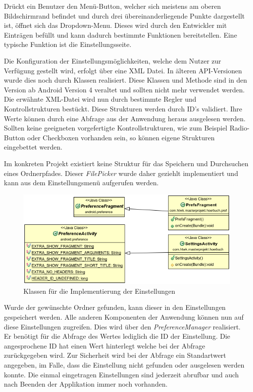 Drückt ein Benutzer den Menü-Button, welcher sich meistens am oberen Bildschirmrand befindet und durch drei übereinanderliegende Punkte dargestellt ist, öffnet sich das Dropdown-Menu. Dieses wird durch den Entwickler mit Einträgen befüllt und kann dadurch bestimmte Funktionen bereitstellen. Eine typische Funktion ist die Einstellungsseite.

Die Konfiguration der Einstellungsmöglichkeiten, welche dem Nutzer zur Verfügung gestellt wird, erfolgt über eine XML Datei. In älteren API-Versionen wurde dies noch durch Klassen realisiert. Diese Klassen und Methode sind in den Version ab Android Version 4 veraltet und sollten nicht mehr verwendet werden. Die erwähnte XML-Datei wird nun durch bestimmte Regler und Kontrollstrukturen bestückt. Diese Strukturen werden durch ID's validiert. Ihre Werte können durch eine Abfrage aus der Anwendung heraus ausgelesen werden. Sollten keine geeigneten vorgefertigte Kontrollstrukturen, wie zum Beispiel Radio-Button oder Checkboxen vorhanden sein, so können eigene Strukturen eingebettet werden.

Im konkreten Projekt existiert keine Struktur für das Speichern und Durchsuchen eines Ordnerpfades. Dieser \textit{FilePicker} wurde daher geziehlt implementiert und kann aus dem Einstellungsmenü aufgerufen werden.

\begin{center}
\begin{figure}
\includegraphics[scale=0.7]{images/settings}
\caption{Klassen für die Implementierung der Einstellungen}
\label{settings}
\end{figure}
\end{center}

Wurde der gewünschte Ordner gefunden, kann dieser in den Einstellungen gespeichert werden. Alle anderen Komponenten der Anwendung können nun auf diese Einstellungen zugreifen. Dies wird über den \textit{PreferenceManager} realisiert. Er benötigt für die Abfrage des Wertes lediglich die ID der Einstellung. Die angesprochene ID hat einen Wert hinterlegt welche bei der Abfrage zurückgegeben wird. Zur Sicherheit wird bei der Abfrage ein Standartwert angegeben, im Falle, dass die Einstellung nicht gefunden oder ausgelesen werden konnte. Die einmal eingetragen Einstellungen sind jederzeit abrufbar und auch nach Beenden der Applikation immer noch vorhanden.

